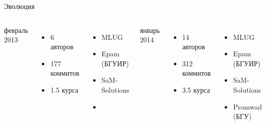 \begin{frame}[fragile]{Эволюция}

  \begin{columns}


	  \begin{center}
		{\Large февраль 2013}
	  \end{center}

	  \begin{itemize}
		\item 6 авторов
		\item 177 коммитов
		\item 1.5 курса
	  \end{itemize}

	  \begin{itemize}
		\item MLUG
		\item Epam (БГУИР)
		\item SaM-Solutions
		\item[]
	  \end{itemize}


	  \begin{center}
		{\Large январь 2014}
	  \end{center}

	  \begin{itemize}
		\item 14 авторов
		\item 312 коммитов
		\item 3.5 курса
	  \end{itemize}

	  \begin{itemize}
		\item MLUG
		\item Epam (БГУИР)
		\item SaM-Solutions
		\item Promwad (БГУ)
	  \end{itemize}

  \end{columns}

\end{frame}



